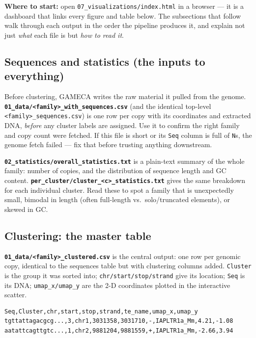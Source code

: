 \documentclass[11pt]{article}
\begin{document}
\medskip
\noindent\textbf{Where to start:} open
\texttt{07\_visualizations/index.html} in a browser --- it is a dashboard
that links every figure and table below. The subsections that follow
walk through each output in the order the pipeline produces it, and
explain not just \emph{what} each file is but \emph{how to read it}.

\subsection{Sequences and statistics (the inputs to everything)}

Before clustering, GAMECA writes the raw material it pulled from the
genome. \textbf{\texttt{01\_data/<family>\_with\_sequences.csv}} (and the
identical top-level \texttt{<family>\_sequences.csv}) is one row per copy
with its coordinates and extracted DNA, \emph{before} any cluster labels
are assigned. Use it to confirm the right family and copy count were
fetched. If this file is short or its \texttt{Seq} column is full of
\texttt{N}s, the genome fetch failed --- fix that before trusting anything
downstream.

\textbf{\texttt{02\_statistics/overall\_statistics.txt}} is a plain-text
summary of the whole family: number of copies, and the distribution of
sequence length and GC content. \textbf{\texttt{per\_cluster/cluster\_<c>\_statistics.txt}}
gives the same breakdown for each individual cluster. Read these to spot
a family that is unexpectedly small, bimodal in length (often full-length
vs.\ solo/truncated elements), or skewed in GC.

\subsection{Clustering: the master table}
\label{sec:master}

\textbf{\texttt{01\_data/<family>\_clustered.csv}} is the central output:
one row per genomic copy, identical to the sequences table but with
clustering columns added. \texttt{Cluster} is the group it was sorted
into; \texttt{chr/start/stop/strand} give its location; \texttt{Seq} is
its DNA; \texttt{umap\_x/umap\_y} are the 2-D coordinates plotted in the
interactive scatter.

\begin{lstlisting}
Seq,Cluster,chr,start,stop,strand,te_name,umap_x,umap_y
tgttattagacgcg...,3,chr1,3031358,3031710,-,IAPLTR1a_Mm,4.21,-1.08
aatattcagttgtc...,1,chr2,9881204,9881559,+,IAPLTR1a_Mm,-2.66,3.94
\end{lstlisting}
\end{document}
